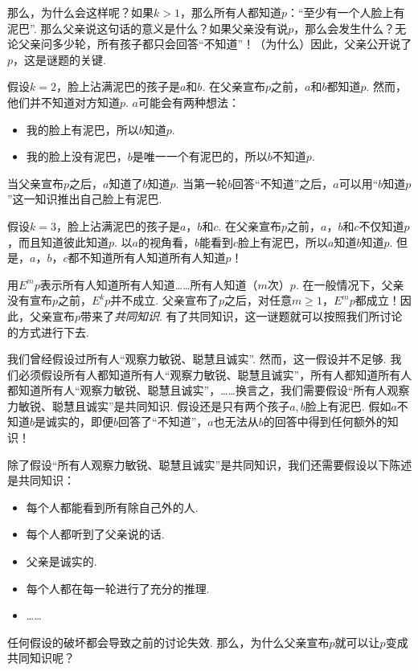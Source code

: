 那么，为什么会这样呢？如果$k>1$，那么所有人都知道$p$：“至少有一个人脸上有泥巴”. 那么父亲说这句话的意义是什么？如果父亲没有说$p$，那么会发生什么？无论父亲问多少轮，所有孩子都只会回答“不知道”！（为什么）因此，父亲公开说了$p$，这是谜题的关键.

假设$k=2$，脸上沾满泥巴的孩子是$a$和$b$. 在父亲宣布$p$之前，$a$和$b$都知道$p$. 然而，他们并不知道对方知道$p$. $a$可能会有两种想法：
    \begin{itemize}
        \item 我的脸上有泥巴，所以$b$知道$p$.
        \item 我的脸上没有泥巴，$b$是唯一一个有泥巴的，所以$b$不知道$p$.
    \end{itemize}
当父亲宣布$p$之后，$a$知道了$b$知道$p$. 当第一轮$b$回答“不知道”之后，$a$可以用“$b$知道$p$”这一知识推出自己脸上有泥巴.

假设$k=3$，脸上沾满泥巴的孩子是$a$，$b$和$c$. 在父亲宣布$p$之前，$a$，$b$和$c$不仅知道$p$，而且知道彼此知道$p$. 以$a$的视角看，$b$能看到$c$脸上有泥巴，所以$a$知道$b$知道$p$. 但是，$a$，$b$，$c$都不知道所有人知道所有人知道$p$！


用$E^m p$表示所有人知道所有人知道……所有人知道（$m$次）$p$. 在一般情况下，父亲没有宣布$p$之前，$E^k p$并不成立. 父亲宣布了$p$之后，对任意$m\geq 1$，$E^m p$都成立！因此，父亲宣布$p$带来了\emph{共同知识}. 有了共同知识，这一谜题就可以按照我们所讨论的方式进行下去.

我们曾经假设过所有人“观察力敏锐、聪慧且诚实”. 然而，这一假设并不足够. 我们必须假设所有人都知道所有人“观察力敏锐、聪慧且诚实”，所有人都知道所有人都知道所有人“观察力敏锐、聪慧且诚实”，……换言之，我们需要假设“所有人观察力敏锐、聪慧且诚实”是共同知识. 假设还是只有两个孩子$a,b$脸上有泥巴. 假如$a$不知道$b$是诚实的，即便$b$回答了“不知道”，$a$也无法从$b$的回答中得到任何额外的知识！

除了假设“所有人观察力敏锐、聪慧且诚实”是共同知识，我们还需要假设以下陈述是共同知识：
    \begin{itemize}
        \item 每个人都能看到所有除自己外的人.
        \item 每个人都听到了父亲说的话.
        \item 父亲是诚实的.
        \item 每个人都在每一轮进行了充分的推理.
        \item ……
    \end{itemize}
任何假设的破坏都会导致之前的讨论失效. 那么，为什么父亲宣布$p$就可以让$p$变成共同知识呢？


